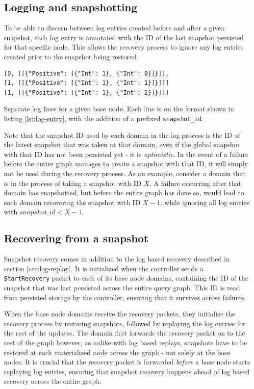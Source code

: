 \documentclass[b5paper]{report}
\begin{document}
\subsection{Logging and snapshotting}
To be able to discern between log entries created before and after a given snapshot,
each log entry is annotated with the ID of the last snapshot persisted for that
specific node. This allows the recovery process to ignore any log entries
created prior to the snapshot being restored.

\begin{listing}[H]
  \begin{verbatim}
[0, [[{"Positive": [{"Int": 1}, {"Int": 0}]}]],
[1, [[{"Positive": [{"Int": 1}, {"Int": 1}]}]]]
[1, [[{"Positive": [{"Int": 1}, {"Int": 2}]}]]]
  \end{verbatim}
  \caption{
    Separate log lines for a given base node. Each line is on the format shown
    in listing \ref{lst:log-entry}, with the addition of a prefixed
    \texttt{snapshot\_id}.
  }
\end{listing}

Note that the snapshot ID used by each domain in the log process is the ID of
the latest snapshot that was taken at that domain, even if the global snapshot
with that ID has not been persisted yet - it is \textit{optimistic}. In the
event of a failure before the entire graph manages to create a snapshot with
that ID, it will simply not be used during the recovery process. As an example,
consider a domain that is in the process of taking a snapshot with ID $ X $. A
failure occurring after that domain has snapshotted, but before the entire graph
has done so, would lead to each domain recovering the snapshot with ID $ X - 1
$, while ignoring all log entries with $ snapshot\_id < X - 1 $.

\subsection{Recovering from a snapshot}
Snapshot recovery comes in addition to the log based recovery described in
section \ref{sec:log-replay}. It is initialized when the controller sends a
\texttt{StartRecovery} packet to each of its base node domains, containing the
ID of the snapshot that was last persisted across the entire query graph. This
ID is read from persisted storage by the controller, ensuring that it survives
across failures.

When the base node domains receive the recovery packets, they initialize the
recovery process by restoring snapshots, followed by replaying the log entries
for the rest of the updates. The domain first forwards the recovery packet on to
the rest of the graph however, as unlike with log based replays, snapshots have
to be restored at each materialized node across the graph - not solely at the base
nodes. It is crucial that the recovery packet is forwarded \textit{before} a
base node starts replaying log entries, ensuring that snapshot recovery happens
ahead of log based recovery across the entire graph.
\end{document}
